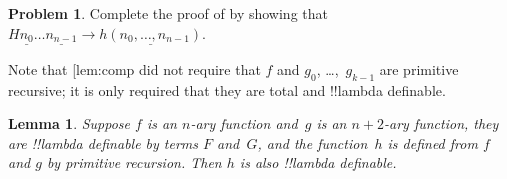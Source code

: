 \documentclass[10pt,a4paper]{article}
\makeatletter
\theoremstyle{plain}
\newtheorem{lem}[thm]{Lemma}
\theoremstyle{definition}
\newtheorem{prob}{Problem}[section]
\theoremstyle{remark}
\newcommand*{\ollabel}[1]{\label{#1}}
\newcommand{\olref}{\@ifnextchar[{\olref@i}{\olref@final}}
\def\olref@i[#1]{\@ifnextchar[{\olref@ii}{\olref@final}}
\def\olref@ii[#1]{\@ifnextchar[{\olref@iii}{\olref@final}}
\def\olref@iii[#1]{\olref@final}
\def\olref@final#1{\ref{#1}}
\providecommand{\num}[1]{\underline{#1}}
\providecommand{\red}{\mathrel{\rightarrow}}
\providecommand{\red}{\mathrel{\rightarrow}}
\makeatother
\begin{document}
\begin{prob}
  Complete the proof of \olref[lam][ldf][prf]{lem:comp} by showing
  that $H\num{n_0}\dots\num{n_{n-1}} \red \num{h(n_0, \dots,
    n_{n-1})}$.
\end{prob}

Note that \olref{lem:comp} did not require that $f$ and $g_0$,
\dots,~$g_{k-1}$ are primitive recursive; it is only required that
they are total and !!{lambda definable}.

\begin{lem}\ollabel{lem:prim}
  Suppose $f$ is an $n$-ary function and~$g$ is an $n+2$-ary function,
  they are !!{lambda definable} by terms $F$ and~$G$, and the
  function~$h$ is defined from $f$ and $g$ by primitive
  recursion. Then $h$ is also !!{lambda definable}.
\end{lem}
\end{document}
